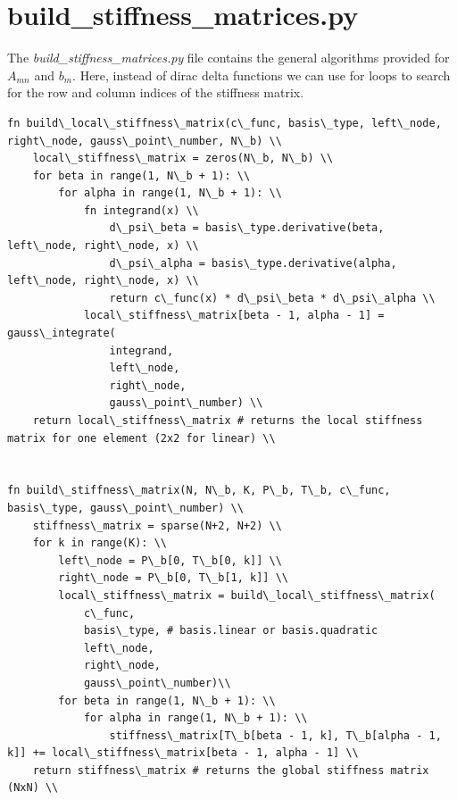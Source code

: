 \documentclass[12pt, oneside]{book}
\begin{document}
\section{build\_stiffness\_matrices.py}

The \textit{build\_stiffness\_matrices.py} file contains the general algorithms 
provided for $A_{mn}$ and $b_m$. Here, instead of dirac delta functions we can use 
for loops to search for the row and column indices of the stiffness matrix.


\begin{lstlisting}
fn build\_local\_stiffness\_matrix(c\_func, basis\_type, left\_node, right\_node, gauss\_point\_number, N\_b) \\
    local\_stiffness\_matrix = zeros(N\_b, N\_b) \\
    for beta in range(1, N\_b + 1): \\
        for alpha in range(1, N\_b + 1): \\
            fn integrand(x) \\
                d\_psi\_beta = basis\_type.derivative(beta, left\_node, right\_node, x) \\
                d\_psi\_alpha = basis\_type.derivative(alpha, left\_node, right\_node, x) \\
                return c\_func(x) * d\_psi\_beta * d\_psi\_alpha \\
            local\_stiffness\_matrix[beta - 1, alpha - 1] = gauss\_integrate(
                integrand, 
                left\_node, 
                right\_node, 
                gauss\_point\_number) \\
    return local\_stiffness\_matrix # returns the local stiffness matrix for one element (2x2 for linear) \\


fn build\_stiffness\_matrix(N, N\_b, K, P\_b, T\_b, c\_func, basis\_type, gauss\_point\_number) \\
    stiffness\_matrix = sparse(N+2, N+2) \\
    for k in range(K): \\
        left\_node = P\_b[0, T\_b[0, k]] \\
        right\_node = P\_b[0, T\_b[1, k]] \\
        local\_stiffness\_matrix = build\_local\_stiffness\_matrix(
            c\_func,
            basis\_type, # basis.linear or basis.quadratic
            left\_node,
            right\_node,
            gauss\_point\_number)\\
        for beta in range(1, N\_b + 1): \\
            for alpha in range(1, N\_b + 1): \\
                stiffness\_matrix[T\_b[beta - 1, k], T\_b[alpha - 1, k]] += local\_stiffness\_matrix[beta - 1, alpha - 1] \\
    return stiffness\_matrix # returns the global stiffness matrix (NxN) \\


\end{lstlisting}
\end{document}
